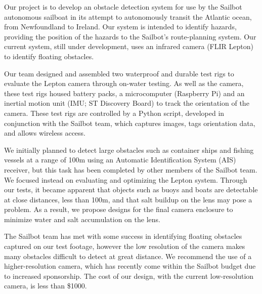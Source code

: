 Our project is to develop an obstacle detection system for use by the Sailbot autonomous sailboat in its attempt to autonomously transit the Atlantic ocean, from Newfoundland to Ireland. Our system is intended to identify hazards, providing the position of the hazards to the Sailbot's route-planning system. Our current system, still under development, uses an infrared camera (FLIR Lepton) to identify floating obstacles.

Our team designed and assembled two waterproof and durable test rigs to evaluate the Lepton camera through on-water testing. As well as the camera, these test rigs housed battery packs, a microcomputer (Raspberry Pi) and an inertial motion unit (IMU; ST Discovery Board) to track the orientation of the camera. These test rigs are controlled by a Python script, developed in conjunction with the Sailbot team, which captures images, tags orientation data, and allows wireless access.

We initially planned to detect large obstacles such as container ships and fishing vessels at a range of 100m using an Automatic Identification System (AIS) receiver, but this task has been completed by other members of the Sailbot team. We focused instead on evaluating and optimizing the Lepton system. Through our tests, it became apparent that objects such as buoys and boats are detectable at close distances, less than 100m, and that salt buildup on the lens may pose a problem. As a result, we propose designs for the final camera enclosure to minimize water and salt accumulation on the lens.

The Sailbot team has met with some success in identifying floating obstacles captured on our test footage, however the low resolution of the camera makes many obstacles difficult to detect at great distance. We recommend the use of a higher-resolution camera, which has recently come within the Sailbot budget due to increased sponsorship. The cost of our design, with the current low-resolution camera, is less than \$1000.

